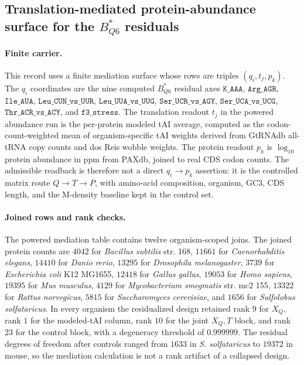 \subsection{Translation-mediated protein-abundance surface for the $B^{\ast}_{Q6}$ residuals}\label{subsec:q6-translation-mediated-protein-abundance-cross-layer}

\paragraph{Finite carrier.}
This record uses a finite mediation surface whose rows are triples $(q_i,t_j,p_k)$.  The $q_i$ coordinates are the nine computed $B^{\ast}_{Q6}$ residual axes
$\texttt{K\_AAA}$, $\texttt{Arg\_AGR}$, $\texttt{Ile\_AUA}$, $\texttt{Leu\_CUN\_vs\_UUR}$, $\texttt{Leu\_UUA\_vs\_UUG}$, $\texttt{Ser\_UCR\_vs\_AGY}$, $\texttt{Ser\_UCA\_vs\_UCG}$, $\texttt{Thr\_ACR\_vs\_ACY}$, and $\texttt{f3\_stress}$.  The translation readout $t_j$ in the powered abundance run is the per-protein modeled tAI average, computed as the codon-count-weighted mean of organism-specific tAI weights derived from GtRNAdb all-tRNA copy counts and dos Reis wobble weights.  The protein readout $p_k$ is $\log_{10}$ protein abundance in ppm from PAXdb, joined to real CDS codon counts.  The admissible readback is therefore not a direct $q_i\to p_k$ assertion: it is the controlled matrix route $Q\to T\to P$, with amino-acid composition, organism, GC3, CDS length, and the M-density baseline kept in the control set.

\paragraph{Joined rows and rank checks.}
The powered mediation table contains twelve organism-scoped joins.  The joined protein counts are $4042$ for \emph{Bacillus subtilis} str. 168, $11661$ for \emph{Caenorhabditis elegans}, $14410$ for \emph{Danio rerio}, $13295$ for \emph{Drosophila melanogaster}, $3739$ for \emph{Escherichia coli} K12 MG1655, $12418$ for \emph{Gallus gallus}, $19053$ for \emph{Homo sapiens}, $19395$ for \emph{Mus musculus}, $4129$ for \emph{Mycobacterium smegmatis} str. mc2 155, $13322$ for \emph{Rattus norvegicus}, $5815$ for \emph{Saccharomyces cerevisiae}, and $1656$ for \emph{Sulfolobus solfataricus}.  In every organism the residualized design retained rank $9$ for $X_Q$, rank $1$ for the modeled-tAI column, rank $10$ for the joint $X_Q,T$ block, and rank $23$ for the control block, with a degeneracy threshold of $0.999999$.  The residual degrees of freedom after controls ranged from $1633$ in \emph{S. solfataricus} to $19372$ in mouse, so the mediation calculation is not a rank artifact of a collapsed design.

